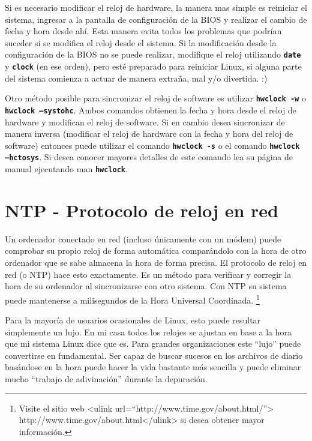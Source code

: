 \documentclass[12pt]{article}
\begin{document}
Si es necesario modificar el reloj de hardware, la manera mas simple es reiniciar el sistema,
ingresar a la pantalla de configuración de la BIOS y realizar el cambio de fecha y hora desde
ahí. Esta manera evita todos los problemas que podrían suceder si se modifica el reloj desde 
el sistema. Si la modificación desde la configuración de la BIOS no se puede realizar, modifique
el reloj utilizando \texttt{\textbf{date}} y \texttt{\textbf{clock}} (en ese orden), pero esté preparado para reiniciar Linux, si
alguna parte del sistema comienza a actuar de manera extraña, mal y/o divertida. :)



Otro método posible para sincronizar el reloj de software es utilizar \texttt{\textbf{hwclock -w}} o \texttt{\textbf{hwclock --systohc}}.
Ambos comandos obtienen la fecha y hora desde el reloj de hardware y modifican el reloj de software.
Si en cambio desea sincronizar de manera inversa (modificar el reloj de hardware con la fecha y
hora del reloj de software) entonces puede utilizar el comando \texttt{\textbf{hwclock -s}} o el comando
\texttt{\textbf{hwclock --hctosys}}. Si desea conocer mayores detalles de este comando lea su página de manual
ejecutando man \texttt{\textbf{hwclock}}.


\section{NTP - Protocolo de reloj en red}


Un ordenador conectado en red (incluso únicamente con un módem) puede 
comprobar su propio reloj de forma automática comparándolo con la hora
de otro ordenador que se sabe almacena la hora de forma precisa. El 
protocolo de reloj en red (o NTP) hace esto exactamente. Es un método para 
verificar y corregir la hora de su ordenador al sincronizarse con otro 
sistema. Con NTP su sistema puede mantenerse a milisegundos de la Hora 
Universal Coordinada. 
	\footnote{Visite el sitio web <ulink url=``http://www.time.gov/about.html/''>
		http://www.time.gov/about.html</ulink> si desea obtener mayor información.
		}
	


Para la mayoría de usuarios ocasionales de Linux, esto puede resultar
simplemente un lujo. En mi casa todos los relojes se ajustan en base a 
la hora que mi sistema Linux dice que es. Para grandes organizaciones 
este ``lujo'' puede convertirse en fundamental. Ser capaz de buscar sucesos 
en los archivos de diario basándose en la hora puede hacer la vida 
bastante más sencilla y puede eliminar mucho ``trabajo de adivinación'' 
durante la depuración.
\end{document}
